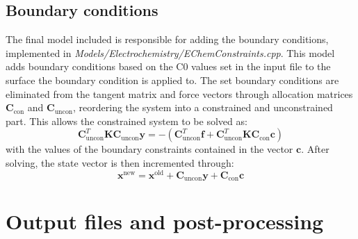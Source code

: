 \documentclass[3p]{elsarticle} %
\begin{document}
\subsection{Boundary conditions}
The final model included is responsible for adding the boundary conditions, implemented in \textit{Models/Electrochemistry/EChemConstraints.cpp}. This model adds boundary conditions based on the C0 values set in the input file to the surface the boundary condition is applied to. The set boundary conditions are eliminated from the tangent matrix and force vectors through  allocation matrices $\bm{C}_\text{con}$ and $\bm{C}_\text{uncon}$, reordering the system into a constrained and unconstrained part. This allows the constrained system to be solved as:
\begin{equation}
	\bm{C}_\text{uncon}^T \bm{K} \bm{C}_\text{uncon} \mathbf{y} = -\left(\bm{C}_\text{uncon}^T\bm{f}+\bm{C}_\text{uncon}^T \bm{K} \bm{C}_\text{con}\mathbf{c}\right)
\end{equation}
with the values of the boundary constraints contained in the vector $\mathbf{c}$. After solving, the state vector is then incremented through:
\begin{equation}
	\mathbf{x}^\text{new} = \mathbf{x}^\text{old} + \bm{C}_\text{uncon}\mathbf{y} + \bm{C}_\text{con}\mathbf{c}
\end{equation}


\section{Output files and post-processing}
\end{document}
